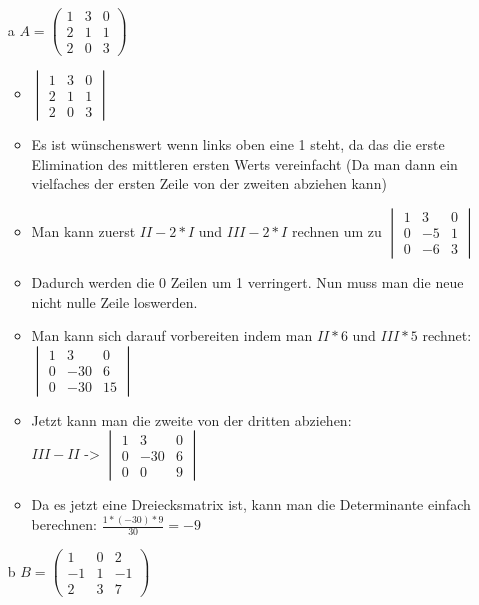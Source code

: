 \documentclass{article}
\begin{document}
\begin{itemize}
		\begin{itemize}
			\item[a]{$A=\begin{pmatrix} 1 & 3 & 0 \\ 2 & 1 & 1 \\ 2 & 0 & 3 \end{pmatrix}$}
			\begin{itemize}
				\item{$\begin{vmatrix} 1 & 3 & 0 \\ 2 & 1 & 1 \\ 2 & 0 & 3 \end{vmatrix}$}
				\item{Es ist wünschenswert wenn links oben eine 1 steht, da das die erste Elimination des mittleren ersten Werts vereinfacht (Da man dann ein vielfaches der ersten Zeile von der zweiten abziehen kann)}
				\item{Man kann zuerst $II-2*I$ und $III-2*I$ rechnen um zu $\begin{vmatrix} 1 & 3 & 0 \\ 0 & -5 & 1 \\ 0 & -6 & 3 \end{vmatrix}$}
				\item{Dadurch werden die 0 Zeilen um 1 verringert. Nun muss man die neue nicht nulle Zeile loswerden.}
				\item{Man kann sich darauf vorbereiten indem man $II*6$ und $III*5$ rechnet: $\begin{vmatrix} 1 & 3 & 0 \\ 0 & -30 & 6 \\ 0 & -30 & 15 \end{vmatrix}$}
				\item{Jetzt kann man die zweite von der dritten abziehen: $III - II \texttt{ -> }\begin{vmatrix} 1 & 3 & 0 \\ 0 & -30 & 6 \\ 0 & 0 & 9 \end{vmatrix}$}
				\item{Da es jetzt eine Dreiecksmatrix ist, kann man die Determinante einfach berechnen: $\frac{1*(-30)*9}{30}=-9$}
			\end{itemize}
			\item[b]{$B=\begin{pmatrix} 1 & 0 & 2 \\ -1 & 1 & -1 \\ 2 & 3 & 7 \end{pmatrix}$}

\end{itemize}
\end{itemize}
\end{document}
